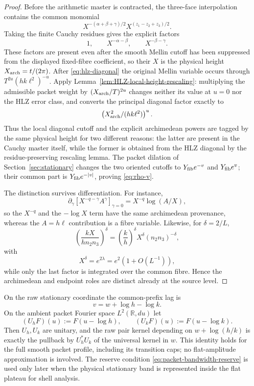 \begin{proof}
Before the arithmetic master is contracted, the three-face interpolation
contains the common monomial
\[
X^{-(\alpha+\beta+\gamma)/2}
X^{(z_1-z_2+z_3)/2}.
\]
Taking the finite Cauchy residues gives the explicit factors
\[
1,\qquad X^{-\alpha-\beta},\qquad X^{-\beta-\gamma}.
\]
These factors are present even after the smooth Mellin cutoff has been
suppressed from the displayed fixed-fibre coefficient, so their $X$ is the
physical height $X_{\rm arch}=t/(2\pi)$.  After
\eqref{eq:hlz-diagonal} the original Mellin variable occurs through
$T^{2u}(hk\ell^2)^{-u}$.  Apply
Lemma~\ref{lem:HLZ-local-height-rescaling}: multiplying the admissible packet
weight by $(X_{\rm arch}/T)^{2u}$ changes neither its value at $u=0$ nor the
HLZ error class, and converts the principal diagonal factor exactly to
\[
\left(X_{\rm arch}^2/(hk\ell^2)\right)^u.
\]
Thus the local diagonal cutoff and the explicit archimedean powers are tagged
by the same physical height for two different reasons: the latter are present
in the Cauchy master itself, while the former is obtained from the HLZ diagonal
by the residue-preserving rescaling lemma.  The packet dilation of
Section~\ref{sec:stationary} changes the two oriented cutoffs to
$Y_{\rm fib}e^{-v}$ and $Y_{\rm fib}e^v$; their common part is
$Y_{\rm fib}e^{-|v|}$, proving \eqref{eq:rho-v}.

The distinction survives differentiation. For instance,
\[
\partial_\gamma
\left[X^{-q-\gamma}A^\gamma\right]_{\gamma=0}
=X^{-q}\log(A/X),
\]
so the $X^{-q}$ and the $-\log X$ term have the same archimedean provenance,
whereas the $A=h\ell$ contribution is a fibre variable. Likewise, for
$\delta=2/L$,
\[
\left(\frac{kX}{h n_2n_3}\right)^\delta
=\left(\frac kh\right)^\delta X^\delta(n_2n_3)^{-\delta},
\]
with
\[
X^\delta=e^{2\lambda}=e^2(1+O(L^{-1})),
\]
while only the last factor is integrated over the common fibre. Hence the
archimedean and endpoint roles are distinct already at the source level.
\end{proof}

\begin{lemma}
\label{lem:outer-translation-intertwiner}
On the raw stationary coordinate the common-prefix lag is
\[
v=w+\log h-\log k.
\]
On the ambient packet Fourier space $L^2(\mathbb R,du)$ let
\[
(U_hF)(u):=F(u-\log h),
\qquad
(U_kF)(u):=F(u-\log k).
\]
Then $U_h,U_k$ are unitary, and the raw pair kernel depending on
$w+\log(h/k)$ is exactly the pullback by $U_h^*U_k$ of the universal kernel in
$w$. This identity holds for the full smooth packet profile, including its
transition caps; no flat-amplitude approximation is involved. The reserve
condition \eqref{eq:packet-bandwidth-reserve} is used only later when the
physical stationary band is represented inside the flat plateau for shell
analysis.
\end{lemma}

